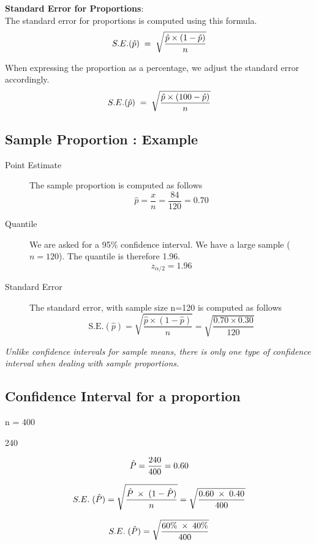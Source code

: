 \documentclass[]{report}
\begin{document}
\noindent \textbf{Standard Error for Proportions}:\\

The standard error for proportions is computed using this formula.
\[
S.E. (\hat{p}) \;=\; \sqrt{ {\hat{p} \times (1-\hat{p} )\over n}}
\]

When expressing the proportion as a percentage, we adjust the standard error accordingly.
\[
S.E. (\hat{p}) \;=\; \sqrt{ {\hat{p} \times (100 -\hat{p} )\over n}}
\]



\subsection{ Sample Proportion : Example}


\begin{description}
\item[Point Estimate] The sample proportion is computed as follows
\[ \hat{p} = \frac{x}{n} = \frac{84}{120} = 0.70 \]
\item[Quantile] We are asked for a 95\% confidence interval. We have a large sample ($n=120$). The quantile is therefore 1.96.
\[ z_{\alpha/2} =1.96\]
\item[Standard Error] The standard error, with sample size n=120 is computed as follows
\[ \mbox{S.E.}(\hat{p}) = \sqrt{\frac{\hat{p} \times (1-\hat{p})}{n}} =  \sqrt{\frac{0.70 \times 0.30}{120}}\]

\end{description}

\textit{Unlike confidence intervals for sample means, there is only one type of confidence interval when dealing with sample proportions.}



\subsection{ Confidence Interval for a proportion}

n = 400

240 


\[\hat{P} = {240 \over 400} = 0.60\]


\[S.E. \;(\hat{P}) = \sqrt{ { \hat{P} \;\times \;(1-\hat{P}) \over n}}= \sqrt{ { 0.60 \;\times \; 0.40 \over 400}}\]



\[S.E. \;(\hat{P}) = \sqrt{ { 60\% \;\times \; 40\% \over 400}}\]
\end{document}
